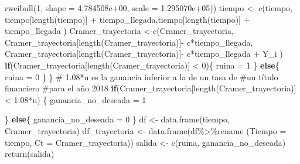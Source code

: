 \documentclass[
  us-letterpaper,
]{scrreprt}
\newenvironment{Shaded}{\begin{snugshade}}{\end{snugshade}}
\newcommand{\AttributeTok}[1]{\textcolor[rgb]{0.40,0.45,0.13}{#1}}
\newcommand{\CommentTok}[1]{\textcolor[rgb]{0.37,0.37,0.37}{#1}}
\newcommand{\ControlFlowTok}[1]{\textcolor[rgb]{0.00,0.23,0.31}{\textbf{#1}}}
\newcommand{\DecValTok}[1]{\textcolor[rgb]{0.68,0.00,0.00}{#1}}
\newcommand{\FloatTok}[1]{\textcolor[rgb]{0.68,0.00,0.00}{#1}}
\newcommand{\FunctionTok}[1]{\textcolor[rgb]{0.28,0.35,0.67}{#1}}
\newcommand{\NormalTok}[1]{\textcolor[rgb]{0.00,0.23,0.31}{#1}}
\newcommand{\OtherTok}[1]{\textcolor[rgb]{0.00,0.23,0.31}{#1}}
\newcommand{\SpecialCharTok}[1]{\textcolor[rgb]{0.37,0.37,0.37}{#1}}
\theoremstyle{definition}
\theoremstyle{plain}
\theoremstyle{plain}
\theoremstyle{remark}
\begin{document}
\begin{Shaded}
\begin{Highlighting}[]
             \FunctionTok{rweibull}\NormalTok{(}\DecValTok{1}\NormalTok{,  }\AttributeTok{shape =} \FloatTok{4.784508e+00}\NormalTok{, }\AttributeTok{scale =} \FloatTok{1.295070e+05}\NormalTok{)) }
\NormalTok{    tiempo }\OtherTok{\textless{}{-}} \FunctionTok{c}\NormalTok{(tiempo, tiempo[}\FunctionTok{length}\NormalTok{(tiempo)] }\SpecialCharTok{+}
\NormalTok{                  tiempo\_llegada,tiempo[}\FunctionTok{length}\NormalTok{(tiempo)] }\SpecialCharTok{+} 
\NormalTok{                  tiempo\_llegada ) }
\NormalTok{    Cramer\_trayectoria }\OtherTok{\textless{}{-}}\FunctionTok{c}\NormalTok{(Cramer\_trayectoria,}
\NormalTok{                Cramer\_trayectoria[}\FunctionTok{length}\NormalTok{(Cramer\_trayectoria)]}\SpecialCharTok{{-}}
\NormalTok{                  c}\SpecialCharTok{*}\NormalTok{tiempo\_llegada,}
\NormalTok{                Cramer\_trayectoria[}\FunctionTok{length}\NormalTok{(Cramer\_trayectoria)]}\SpecialCharTok{{-}}
\NormalTok{                  c}\SpecialCharTok{*}\NormalTok{tiempo\_llegada }\SpecialCharTok{+}\NormalTok{  Y\_i )}
    \ControlFlowTok{if}\NormalTok{(Cramer\_trayectoria[}\FunctionTok{length}\NormalTok{(Cramer\_trayectoria)] }\SpecialCharTok{\textless{}} \DecValTok{0}\NormalTok{)\{}
\NormalTok{      ruina }\OtherTok{=} \DecValTok{1}
\NormalTok{    \}}
    \ControlFlowTok{else}\NormalTok{\{}
\NormalTok{      ruina }\OtherTok{=} \DecValTok{0}
\NormalTok{    \}}
\NormalTok{  \}}
\CommentTok{\# 1.08*u es la ganancia inferior a la de un tasa de }
  \CommentTok{\#un título financiero }
\CommentTok{\#para el año 2018}
  \ControlFlowTok{if}\NormalTok{(Cramer\_trayectoria[}\FunctionTok{length}\NormalTok{(Cramer\_trayectoria)] }\SpecialCharTok{\textless{}} \FloatTok{1.08}\SpecialCharTok{*}\NormalTok{u) \{}
\NormalTok{    ganancia\_no\_deseada }\OtherTok{=} \DecValTok{1}
    
\NormalTok{  \} }
  \ControlFlowTok{else}\NormalTok{\{}
\NormalTok{    ganancia\_no\_deseada }\OtherTok{=} \DecValTok{0}
\NormalTok{  \}}
\NormalTok{  df }\OtherTok{\textless{}{-}} \FunctionTok{data.frame}\NormalTok{(tiempo, Cramer\_trayectoria)}
\NormalTok{  df\_trayectoria }\OtherTok{\textless{}{-}} \FunctionTok{data.frame}\NormalTok{(df}\SpecialCharTok{\%\textgreater{}\%}\NormalTok{rename}
\NormalTok{                               (}\AttributeTok{Tiempo =}\NormalTok{ tiempo, }
                                \AttributeTok{Ct =}\NormalTok{ Cramer\_trayectoria))}
\NormalTok{  salida }\OtherTok{\textless{}{-}} \FunctionTok{c}\NormalTok{(ruina, ganancia\_no\_deseada)}
  \FunctionTok{return}\NormalTok{(salida)}
  

\end{Highlighting}
\end{Shaded}
\end{document}
